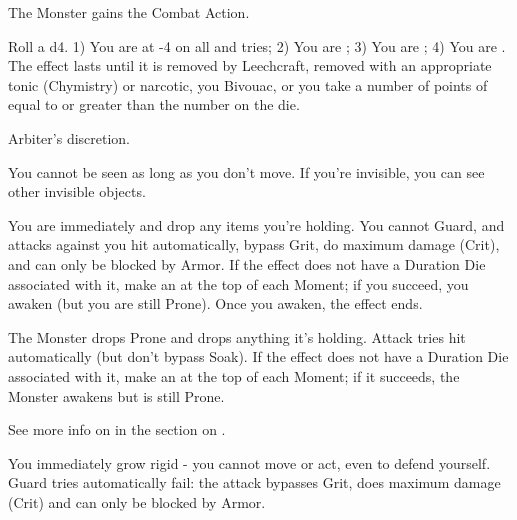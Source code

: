 \begin{multicols*}{2}
     The Monster gains the  Combat Action.


  Roll a d4.  1) You are at -4 on all \RO and \RB tries;  2) You are ;  3) You are ; 4) You are .  The effect lasts until it is removed by Leechcraft, removed with an appropriate tonic (Chymistry) or narcotic, you Bivouac, or you take a number of points of  equal to or greater than the number on the die.

     Arbiter's discretion.

\cbreak



  You cannot be seen as long as you don't move.  If you're invisible, you can see other invisible objects.


  You are immediately  and drop any items you're holding.  You cannot Guard, and attacks against you hit automatically, bypass Grit, do maximum damage (Crit), and can only be blocked by Armor.  If the effect does not have a Duration Die associated with it, make an \RSTRY{\VIG} at the top of each Moment; if you succeed, you awaken (but you are still Prone).  Once you awaken, the effect ends.

     The Monster drops Prone and drops anything it's holding.  Attack tries hit automatically (but don't bypass Soak). If the effect does not have a Duration Die associated with it, make an \RSTRY{\VIG} at the top of each Moment; if it succeeds, the Monster awakens but is still Prone.  




  See more info on  in the section on .





  You immediately grow rigid - you cannot move or act, even to defend yourself.  Guard tries automatically fail: the attack bypasses Grit, does maximum damage (Crit) and can only be blocked by Armor.  


\end{multicols*}
